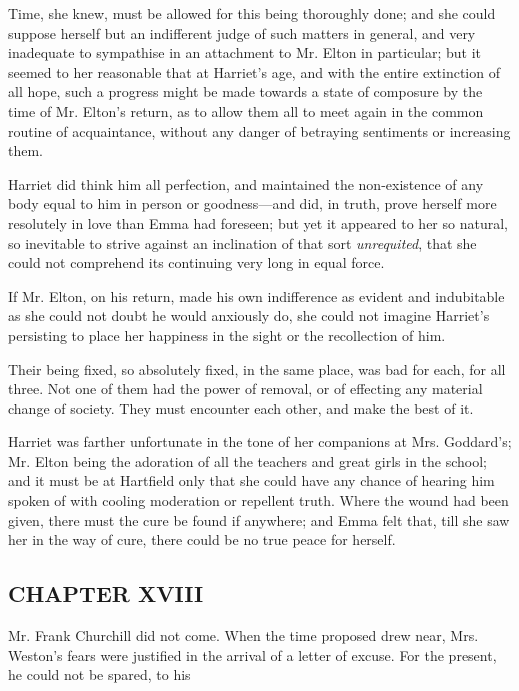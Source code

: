 Time, she knew, must be allowed for this being thoroughly done; and she could suppose herself but an indifferent judge of such matters in general, and very inadequate to sympathise in an attachment to Mr. Elton in particular; but it seemed to her reasonable that at Harriet's age, and with the entire extinction of all hope, such a progress might be made towards a state of composure by the time of Mr. Elton's return, as to allow them all to meet again in the common routine of acquaintance, without any danger of betraying sentiments or increasing them.

Harriet did think him all perfection, and maintained the non-existence of any body equal to him in person or goodness---and did, in truth, prove herself more resolutely in love than Emma had foreseen; but yet it appeared to her so natural, so inevitable to strive against an inclination of that sort {\em unrequited}, that she could not comprehend its continuing very long in equal force.

If Mr. Elton, on his return, made his own indifference as evident and indubitable as she could not doubt he would anxiously do, she could not imagine Harriet's persisting to place her happiness in the sight or the recollection of him.

Their being fixed, so absolutely fixed, in the same place, was bad for each, for all three. Not one of them had the power of removal, or of effecting any material change of society. They must encounter each other, and make the best of it.

Harriet was farther unfortunate in the tone of her companions at Mrs. Goddard's; Mr. Elton being the adoration of all the teachers and great girls in the school; and it must be at Hartfield only that she could have any chance of hearing him spoken of with cooling moderation or repellent truth. Where the wound had been given, there must the cure be found if anywhere; and Emma felt that, till she saw her in the way of cure, there could be no true peace for herself.

\subsection[chapter-xviii]{\useURL[url18][][][]\from[url18]CHAPTER XVIII}

Mr. Frank Churchill did not come. When the time proposed drew near, Mrs. Weston's fears were justified in the arrival of a letter of excuse. For the present, he could not be spared, to his 

